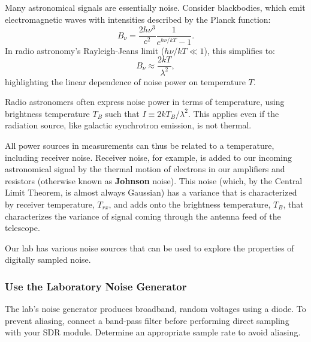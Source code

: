 \documentclass[11pt,preprint]{aastex}
\begin{document}
Many astronomical signals are essentially noise. Consider blackbodies, which emit electromagnetic waves with intensities described by the Planck function:
\begin{equation}
B_\nu = \frac{2h\nu^3}{c^2}\frac{1}{e^{h\nu/kT}-1}.
\end{equation}
In radio astronomy's Rayleigh-Jeans limit ($h\nu/kT \ll 1$), this simplifies to:
\begin{equation}
B_\nu\approx\frac{2kT}{\lambda^2},
\end{equation}
highlighting the linear dependence of noise power on temperature $T$.

Radio astronomers often express noise power in terms of temperature, using brightness temperature $T_B$ such that $I\equiv2kT_B/\lambda^2$. This applies even if the radiation source, like galactic synchrotron emission, is not thermal.

All power sources in measurements can thus be related to a temperature, including receiver noise.
Receiver noise, for example, is added to our incoming astronomical signal 
by the thermal motion of electrons in our amplifiers and resistors 
(otherwise known as {\bf Johnson} noise).  This noise (which,
by the Central Limit Theorem, is almost always Gaussian) has a variance that
is characterized by receiver temperature, $T_{rx}$, and adds onto the brightness temperature, $T_B$, 
that characterizes the variance of signal coming through the antenna feed of the telescope.

Our lab has various noise sources that can be used to explore the properties of digitally sampled noise.


\subsubsection{Use the Laboratory Noise Generator}

\noindent
The lab's noise generator produces broadband, random voltages using a diode. To prevent aliasing, connect a band-pass filter before performing direct sampling with your SDR module. Determine an appropriate sample rate to avoid aliasing.
\end{document}
